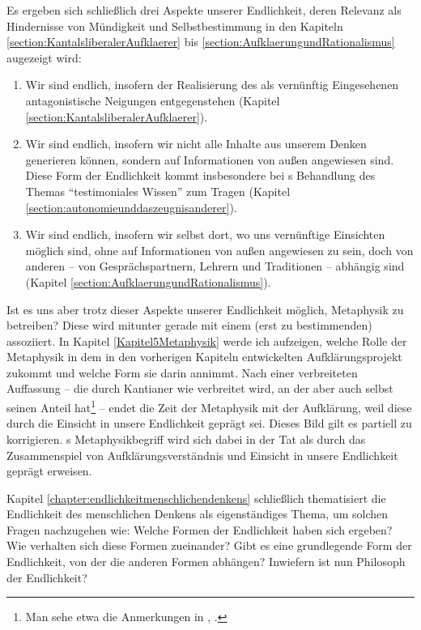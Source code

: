 Es ergeben sich schließlich drei Aspekte unserer Endlichkeit, deren Relevanz als
Hindernisse von Mündigkeit und Selbstbestimmung in den Kapiteln
\ref{section:KantalsliberalerAufklaerer} bis
\ref{section:AufklaerungundRationalismus} augezeigt wird:
\begin{enumerate}
\item Wir sind endlich, insofern der Realisierung des als vernünftig
Eingesehenen antagonistische Neigungen entgegenstehen (Kapitel \ref{section:KantalsliberalerAufklaerer}).
\item Wir sind endlich, insofern wir nicht alle Inhalte aus unserem Denken
generieren können, sondern auf Informationen von außen angewiesen sind. Diese
Form der Endlichkeit kommt insbesondere bei s Behandlung
des Themas \enquote{testimoniales Wissen} zum Tragen
(Kapitel \ref{section:autonomieunddaszeugnisanderer}).
\item Wir sind endlich, insofern wir selbst dort, wo uns vernünftige Einsichten
möglich sind, ohne auf Informationen von außen angewiesen zu sein, doch von
anderen -- von Gesprächspartnern, Lehrern und Traditionen -- abhängig sind
(Kapitel \ref{section:AufklaerungundRationalismus}).
\end{enumerate}

Ist es uns aber trotz dieser Aspekte unserer Endlichkeit möglich, Metaphysik zu
betreiben? Diese wird mitunter gerade mit einem (erst zu bestimmenden)
 assoziiert. In Kapitel \ref{Kapitel5Metaphysik} werde
ich aufzeigen, welche Rolle der Metaphysik in dem in den vorherigen Kapiteln
entwickelten Aufklärungsprojekt zukommt und welche Form sie darin annimmt. Nach
einer verbreiteten Auffassung -- die durch Kantianer wie
 verbreitet wird, an der aber auch
 selbst seinen Anteil hat\footnote{Man sehe etwa die
Anmerkungen in \cite[][A xi]{Kant:KritikderreinenVernunft2003},
\cite[][IV: 9.26--39]{Kant:GesammelteWerke1900ff.}.} -- endet die Zeit der
Metaphysik mit der Aufklärung, weil diese durch die Einsicht in unsere Endlichkeit geprägt sei.
Dieses Bild gilt es partiell zu korrigieren. s Metaphysikbegriff wird
sich dabei in der Tat als durch das Zusammenspiel von Aufklärungsverständnis und
Einsicht in unsere Endlichkeit geprägt erweisen.

Kapitel \ref{chapter:endlichkeitmenschlichendenkens} schließlich thematisiert
die Endlichkeit des menschlichen Denkens als eigenständiges Thema, um solchen
Fragen nachzugehen wie: Welche Formen der Endlichkeit haben sich ergeben? Wie
verhalten sich diese Formen zueinander? Gibt es eine grundlegende Form der
Endlichkeit, von der die anderen Formen abhängen? Inwiefern ist
 nun  Philosoph der Endlichkeit?

